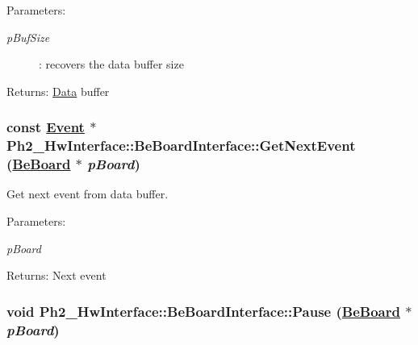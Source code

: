 \begin{Desc}
\item[Parameters:]
\begin{description}
\item[{\em p\-Buf\-Size}]: recovers the data buffer size \end{description}
\end{Desc}
\begin{Desc}
\item[Returns:]\hyperlink{class_ph2___hw_interface_1_1_data}{Data} buffer \end{Desc}
\hypertarget{class_ph2___hw_interface_1_1_be_board_interface_8dadf0d6aba310d1476b5c50aae98742}{
\subsubsection[GetNextEvent]{\setlength{\rightskip}{0pt plus 5cm}const \hyperlink{class_ph2___hw_interface_1_1_event}{Event} $\ast$ Ph2\_\-Hw\-Interface::Be\-Board\-Interface::Get\-Next\-Event (\hyperlink{class_ph2___hw_description_1_1_be_board}{Be\-Board} $\ast$ {\em p\-Board})}}
\label{class_ph2___hw_interface_1_1_be_board_interface_8dadf0d6aba310d1476b5c50aae98742}


Get next event from data buffer. 

\begin{Desc}
\item[Parameters:]
\begin{description}
\item[{\em p\-Board}]\end{description}
\end{Desc}
\begin{Desc}
\item[Returns:]Next event \end{Desc}
\hypertarget{class_ph2___hw_interface_1_1_be_board_interface_2b9692f018d7756fbfd720224da542da}{
\subsubsection[Pause]{\setlength{\rightskip}{0pt plus 5cm}void Ph2\_\-Hw\-Interface::Be\-Board\-Interface::Pause (\hyperlink{class_ph2___hw_description_1_1_be_board}{Be\-Board} $\ast$ {\em p\-Board})}}
\label{class_ph2___hw_interface_1_1_be_board_interface_2b9692f018d7756fbfd720224da542da}


